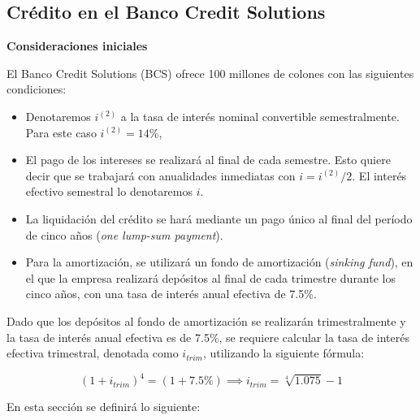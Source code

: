 \documentclass[12pt]{article}
\newcommand{\intnom}[2]{{#1}^{(#2)}}
\begin{document}
\subsection{Crédito en el Banco Credit Solutions}

\textbf{Consideraciones iniciales}

El Banco Credit Solutions (BCS) ofrece 100 millones de colones con las siguientes condiciones:

\begin{itemize}
    \item Denotaremos $\intnom{i}{2}$ a la tasa de interés nominal convertible semestralmente. Para este caso $\intnom{i}{2} = 14 \%$, 
    \item El pago de los intereses se realizará al final de cada semestre. Esto quiere decir que se trabajará con anualidades inmediatas con $i = \intnom{i}{2}/2$. El interés efectivo semestral lo denotaremos $i$.
    \item La liquidación del crédito se hará mediante un pago único al final del período de cinco años (\textit{one lump-sum payment}).
    \item Para la amortización, se utilizará un fondo de amortización (\textit{sinking fund}), en el que la empresa realizará depósitos al final de cada trimestre durante los cinco años, con una tasa de interés anual efectiva de 7.5\%.
\end{itemize}


Dado que los depósitos al fondo de amortización se realizarán trimestralmente y la tasa de interés anual efectiva es de 7.5\%, se requiere calcular la tasa de interés efectiva trimestral, denotada como $i_{trim}$, utilizando la siguiente fórmula:

    \begin{equation}
        (1+i_{trim})^4 = (1+7.5\%) \implies i_{trim} = \sqrt[4]{1.075} -1 
        \label{interes.trimestral}
    \end{equation}
    
En esta sección se definirá lo siguiente:
\end{document}
